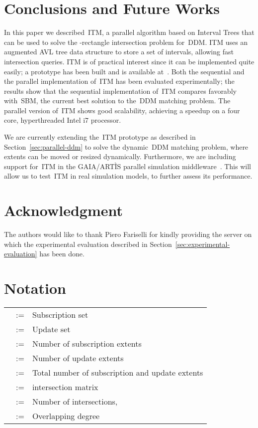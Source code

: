 \documentclass[10pt, conference, compsocconf]{IEEEtran}
\begin{document}
\section{Conclusions and Future Works}\label{sec:conclusions}

In this paper we described~\ac{ITM}, a parallel algorithm based on
Interval Trees that can be used to solve the -rectangle
intersection problem for~\ac{DDM}. \ac{ITM} uses an augmented AVL tree
data structure to store a set of intervals, allowing fast intersection
queries. \ac{ITM} is of practical interest since it can be implemented
quite easily; a prototype has been built and is available
at~\cite{pads}.  Both the sequential and the parallel implementation
of~\ac{ITM} has been evaluated experimentally; the results show that
the sequential implementation of~\ac{ITM} compares favorably
with~\acl{SBM}, the current best solution to the~\ac{DDM} matching
problem. The parallel version of~\ac{ITM} shows good scalability,
achieving a  speedup on a four core, hyperthreaded Intel i7
processor.

We are currently extending the~\ac{ITM} prototype as described in
Section~\ref{sec:parallel-ddm} to solve the dynamic~\ac{DDM} matching
problem, where extents can be moved or resized
dynamically. Furthermore, we are including support for~\ac{ITM} in the
GAIA/ART\`IS parallel simulation middleware~\cite{gda-dsrt-2004}. This
will allow us to test~\ac{ITM} in real simulation models, to further
assess its performance.

\section*{Acknowledgment}

The authors would like to thank Piero Fariselli for kindly providing
the server on which the experimental evaluation described in
Section~\ref{sec:experimental-evaluation} has been done.

\section*{Notation}

\begin{center}
\begin{tabular}{rcl}
 & := & Subscription set  \\
 & := & Update set  \\
 & := & Number of subscription extents \\
 & := & Number of update extents\\
 & := & Total number of subscription and update extents\\
 & := &  intersection matrix\\
 & := & Number of intersections,  \\
 & := & Overlapping degree\\
\end{tabular}
\end{center}
\end{document}
